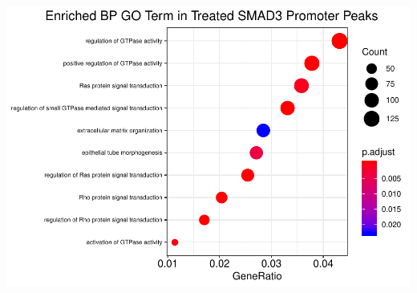 \documentclass[]{article}
\begin{document}
\clearpage{}

\includegraphics{Bioinfo_Analysis_files/figure-latex/unnamed-chunk-26-1.pdf}
\end{document}
